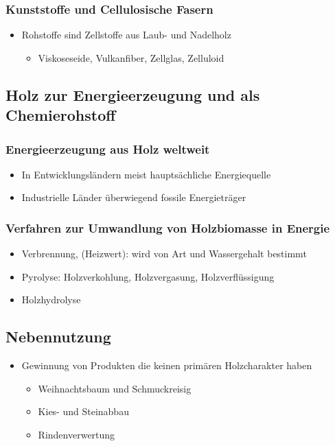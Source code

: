 \documentclass[12pt]{article}
\begin{document}
\subsubsection{Kunststoffe und Cellulosische Fasern}
\begin{itemize}
  \item Rohstoffe sind Zellstoffe aus Laub- und Nadelholz
  \begin{itemize}
    \item Viskoseseide, Vulkanfiber, Zellglas, Zelluloid
  \end{itemize}
\end{itemize}

\subsection{Holz zur Energieerzeugung und als Chemierohstoff}
\subsubsection{Energieerzeugung aus Holz weltweit}
\begin{itemize}
  \item In Entwicklungsländern meist hauptsächliche Energiequelle
  \item Industrielle Länder überwiegend fossile Energieträger
\end{itemize}

\subsubsection{Verfahren zur Umwandlung von Holzbiomasse in Energie}
\begin{itemize}
  \item Verbrennung, (Heizwert): wird von Art und Wassergehalt bestimmt
  \item Pyrolyse: Holzverkohlung, Holzvergasung, Holzverflüssigung
  \item Holzhydrolyse
\end{itemize}
\subsection{Nebennutzung}
\begin{itemize}
  \item Gewinnung von Produkten die keinen primären Holzcharakter haben
  \begin{itemize}
    \item Weihnachtsbaum und Schmuckreisig
    \item Kies- und Steinabbau
    \item Rindenverwertung
  \end{itemize}
\end{itemize}
\end{document}
